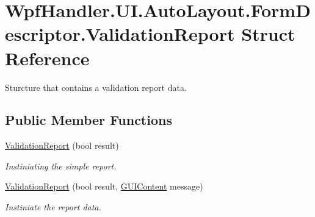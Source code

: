 \hypertarget{struct_wpf_handler_1_1_u_i_1_1_auto_layout_1_1_form_descriptor_1_1_validation_report}{}\section{Wpf\+Handler.\+U\+I.\+Auto\+Layout.\+Form\+Descriptor.\+Validation\+Report Struct Reference}
\label{struct_wpf_handler_1_1_u_i_1_1_auto_layout_1_1_form_descriptor_1_1_validation_report}


Sturcture that contains a validation report data.  


\subsection*{Public Member Functions}
\begin{DoxyCompactItemize}
\item 
\mbox{\hyperlink{struct_wpf_handler_1_1_u_i_1_1_auto_layout_1_1_form_descriptor_1_1_validation_report_a1275fe61d36101439b465c802ec9aa7e}{Validation\+Report}} (bool result)
\begin{DoxyCompactList}\small\item\em Instiniating the simple report. \end{DoxyCompactList}\item 
\mbox{\hyperlink{struct_wpf_handler_1_1_u_i_1_1_auto_layout_1_1_form_descriptor_1_1_validation_report_ae484c3444567552ac38a1211c12d60c7}{Validation\+Report}} (bool result, \mbox{\hyperlink{class_wpf_handler_1_1_u_i_1_1_g_u_i_content}{G\+U\+I\+Content}} message)
\begin{DoxyCompactList}\small\item\em Instiniate the report data. \end{DoxyCompactList}\end{DoxyCompactItemize}
